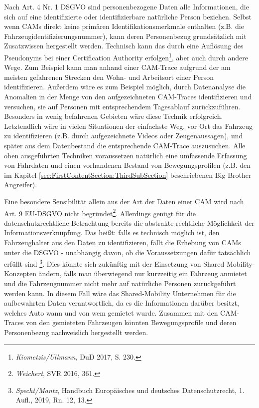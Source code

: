 Nach Art. 4 Nr. 1 DSGVO sind personenbezogene Daten alle Informationen, die sich auf eine identifizierte oder identifizierbare natürliche Person beziehen. Selbst wenn CAMs direkt keine primären Identifikationsmerkmale enthalten (z.B. die Fahrzeugidentifizierungsnummer), kann deren Personenbezug grundsätzlich mit Zusatzwissen hergestellt werden. Technisch kann das durch eine Auflösung des Pseudonyms bei einer Certification Authority erfolgen\footnote{\emph{Kiometzis/Ullmann}, DuD 2017, S. 230.}\nocite{Kiometzis2017}, aber auch durch andere Wege. Zum Beispiel kann man anhand einer CAM-Trace aufgrund der am meisten gefahrenen Strecken den Wohn- und Arbeitsort einer Person identifizieren. Außerdem wäre es zum Beispiel möglich, durch Datenanalyse die Anomalien in der Menge von den aufgezeichneten CAM-Traces identifizieren und versuchen, sie auf Personen mit entsprechendem Tagesablauf zurückzuführen. Besonders in wenig befahrenen Gebieten wäre diese Technik erfolgreich. Letztendlich wäre in vielen Situationen der einfachste Weg, vor Ort das Fahrzeug zu identifizieren (z.B. durch aufgezeichnete Videos oder Zeugenaussagen), und später aus dem Datenbestand die entsprechende CAM-Trace auszusuchen. Alle oben ausgeführten Techniken voraussetzen natürlich eine umfassende Erfassung von Fahrdaten und einen vorhandenen Bestand von Bewegungsprofilen (z.B. den im Kapitel \ref{sec:FirstContentSection:ThirdSubSection} beschriebenen Big Brother Angreifer).

Eine besondere Sensibilität allein aus der Art der Daten einer CAM wird nach Art. 9 EU-DSGVO nicht begründet\footnote{\emph{Weichert}, SVR 2016, 361.}\nocite{Weichert2016}. Allerdings genügt für die datenschutzrechtliche Betrachtung bereits die abstrakte rechtliche Möglichkeit der Informationsverknüpfung. Das heißt: falls es technisch möglich ist, den Fahrzeughalter aus den Daten zu identifizieren, fällt die Erhebung von CAMs unter die DSGVO - unabhängig davon, ob die Voraussetzungen dafür tatsächlich erfüllt sind  \footnote{\emph{Specht/Mantz}, Handbuch Europäisches und deutsches Datenschutzrecht, 1. Aufl., 2019, Rn. 12, 13.}. Dies könnte sich zukünftig mit der Einsetzung von Shared Mobility-Konzepten ändern, falls man überwiegend nur kurzzeitig ein Fahrzeug anmietet und die Fahrzeugnummer nicht mehr auf natürliche Personen zurückgeführt werden kann. In diesem Fall wäre das Shared-Mobility Unternehmen für die aufbewahrten Daten verantwortlich, da es die Informationen darüber besitzt, welches Auto wann und von wem gemietet wurde. Zusammen mit den CAM-Traces von den gemieteten Fahrzeugen könnten Bewegungsprofile und deren Personenbezug nachweislich hergestellt werden.


